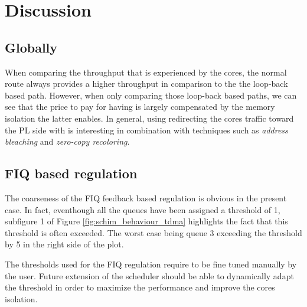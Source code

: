 \section{Discussion}
    \subsection{Globally}
      When comparing the throughput that is experienced by the cores, the normal route always provides a higher throughput in comparison to the the loop-back based path.
      However, when only comparing those loop-back based paths, we can see that the price to pay for having \schim is largely compensated by the memory isolation the latter enables.
    In general, using redirecting the cores traffic toward the PL side with \schim is interesting in combination with techniques such as  \textit{address bleaching} and \textit{zero-copy recoloring}.
    
    \subsection{FIQ based regulation}
      The coarseness of the FIQ feedback based regulation is obvious in the present case. In fact, eventhough all the queues have been assigned a threshold of 1, subfigure 1 of Figure \ref{fig:schim_behaviour_tdma} highlights the fact that this threshold is often exceeded. The worst case being queue 3 exceeding the threshold by 5 in the right side of the plot.
      
      The thresholds used for the FIQ regulation require to be fine tuned manually by the user. Future extension of the \schim scheduler should be able to dynamically adapt the threshold in order to maximize the performance and improve the cores isolation.
